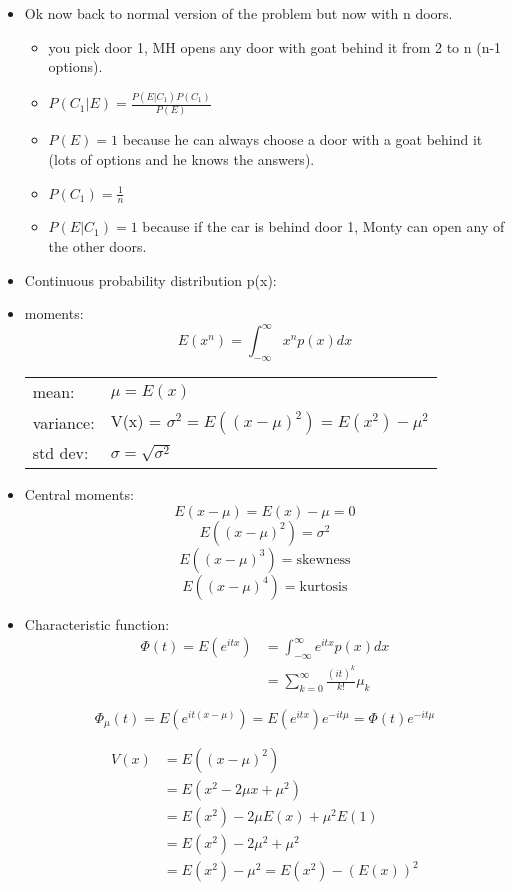 \begin{itemize}
    \item Ok now back to normal version of the problem but now with n doors.
    \begin{itemize}
        \item you pick door 1, MH opens any door with goat behind it from 2 to n (n-1 options).
        \item $P(C_1 | E) = \frac{P(E | C_1) P(C_1)}{P(E)}$
        \item $P(E) =1$ because he can always choose a door with a goat behind it (lots of options and he knows the answers).
        \item $P(C_1) = \frac{1}{n}$
        \item $P(E | C_1) = 1$ because if the car is behind door 1, Monty can open any of the other doors.
    \end{itemize}
    \item Continuous probability distribution p(x):
    \item moments: 
    \[ E(x^n) = \int_{-\infty}^{\infty} x^n p(x) dx \]


    \begin{tabular}[c]{ll}
        mean: & $\mu = E(x)$ \\
        variance: & V(x) = $\sigma^2 = E((x-\mu)^2) = E(x^2) - \mu^2$ \\
        std dev: & $\sigma = \sqrt{\sigma^2}$
    \end{tabular}

    \item Central moments:
    \[ E(x-\mu)= E(x) - \mu = 0 \]
    \[ E((x-\mu)^2) = \sigma^2 \]
    \[ E((x-\mu)^3) = \text{skewness} \]
    \[ E((x-\mu)^4) = \text{kurtosis} \]

    \item Characteristic function:
    \begin{align}
        \Phi(t) = E(e^{itx}) &= \int_{-\infty}^{\infty} e^{itx} p(x) dx \\  
                &= \sum_{k=0}^{\infty} \frac{(it)^k}{k!} \mu_k
    \end{align}

    \[ \Phi_{\mu}(t) = E(e^{it(x-\mu)}) = E(e^{itx}) e^{-it\mu} = \Phi(t) e^{-it\mu} \]

    \begin{align}
    V(x) &= E((x-\mu)^2) \\
    &= E(x^2 - 2\mu x + \mu^2) \\
    &= E(x^2) - 2\mu E(x) + \mu^2 E(1) \\
    &= E(x^2) - 2\mu^2 + \mu^2 \\
    &= E(x^2) - \mu^2 = E(x^2) - (E(x))^2
    \end{align} 


\end{itemize}
